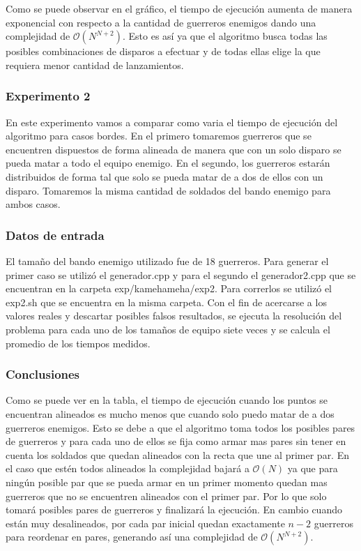 			Como se puede observar en el gráfico, el tiempo de ejecución aumenta de manera exponencial con respecto a la cantidad de guerreros enemigos dando una complejidad de $\mathcal{O}(N^{N+2})$. Esto es así ya que el algoritmo busca todas las posibles combinaciones de disparos a efectuar y de todas ellas elige la que requiera menor cantidad de lanzamientos. \;

		\;
		\;
		
    	\subsubsection*{Experimento 2}\;
    		En este experimento vamos a comparar como varia el tiempo de ejecución del algoritmo para casos bordes. En el primero tomaremos guerreros que se encuentren dispuestos de forma alineada de manera que con un solo disparo se pueda matar a todo el equipo enemigo. En el segundo, los guerreros estarán distribuidos de forma tal que solo se pueda matar de a dos de ellos con un disparo. Tomaremos la misma cantidad de soldados del bando enemigo para ambos casos. \;

    	\subsubsection*{Datos de entrada}\;
    		El tamaño del bando enemigo utilizado fue de 18 guerreros.
			Para generar el primer caso se utilizó el generador.cpp y para el segundo el generador2.cpp que se encuentran en la carpeta exp/kamehameha/exp2. Para correrlos se utilizó el exp2.sh que se encuentra en la misma carpeta.\;
			Con el fin de acercarse a los valores reales y descartar posibles falsos resultados, se ejecuta la resolución del problema para cada uno de los tamaños de equipo siete veces y se calcula el promedio de los tiempos medidos.\;

		\subsubsection*{Conclusiones}\;
			Como se puede ver en la tabla, el tiempo de ejecución cuando los puntos se encuentran alineados es mucho menos que cuando solo puedo matar de a dos guerreros enemigos. Esto se debe a que el algoritmo toma todos los posibles pares de guerreros y para cada uno de ellos se fija como armar mas pares sin tener en cuenta los soldados que quedan alineados con la recta que une al primer par. En el caso que estén todos alineados la complejidad bajará a $\mathcal{O}(N)$ ya que para ningún posible par que se pueda armar en un primer momento quedan mas guerreros que no se encuentren alineados con el primer par. Por lo que solo tomará posibles pares de guerreros y finalizará la ejecución. En cambio cuando están muy desalineados, por cada par inicial quedan exactamente $n - 2$ guerreros para reordenar en pares, generando así una complejidad de $\mathcal{O}(N^{N+2})$.


